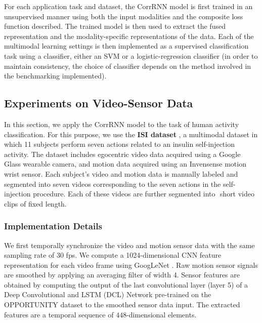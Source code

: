 \documentclass[10pt,twocolumn,letterpaper]{article}
\begin{document}
For each application task and dataset, the CorrRNN model is first trained in an unsupervised manner using both  the input modalities and the composite loss function described. The trained model is then used to extract %
the fused representation and the modality-specific representations of the data. Each of the multimodal learning settings is then implemented as a supervised classification task using a classifier, either an SVM or a logistic-regression classifier (in order to maintain consistency, the choice of classifier depends on the method involved in the benchmarking implemented). 






\subsection{Experiments on Video-Sensor Data}
\label{sec:exp1}
In this section, we apply the CorrRNN model to the task of human activity classification. For this purpose, we use the \textbf{ISI dataset} \cite{kumar2015fly}, a multimodal dataset in which 11 subjects perform seven actions related to an insulin self-injection activity. The dataset  includes egocentric video data acquired using a Google Glass wearable camera, and motion data acquired using an Invensense motion wrist sensor. Each subject's video and motion data is manually labeled and segmented into seven videos corresponding to the seven actions in the self-injection procedure. Each of these videos are further segmented into $ $ short video clips of fixed length. %



\subsubsection{Implementation Details}
We first temporally synchronize the video and motion sensor data with the same sampling rate of 30 fps. We compute a 1024-dimensional CNN feature representation for each video frame using GoogLeNet \cite{szegedy2015going}. Raw motion sensor signals are smoothed by applying an averaging filter of width 4. Sensor features are obtained by computing the output of the last convolutional layer (layer 5) of a Deep Convolutional and LSTM (DCL) Network \cite{ordonez2016deep} pre-trained on the OPPORTUNITY dataset \cite{roggen2010collecting} to the smoothed sensor data input. The extracted features are a temporal sequence of $448$-dimensional elements. 
\end{document}
